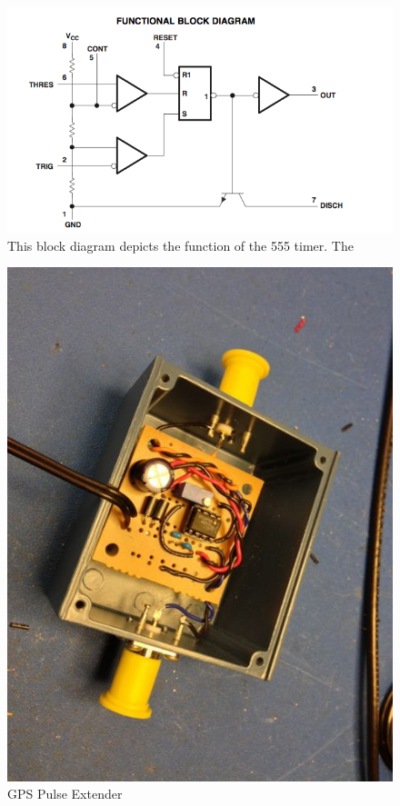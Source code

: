 \begin{figure}[htbp]
	\centering
		\includegraphics[width=15cm]{./figures/timer555.png}
	\caption[555 Timer Diagram]{This block diagram depicts the function of the 555 timer. The }
	\label{fig:timer_diag}
\end{figure}


\begin{figure}[htbp]
	\centering
		\includegraphics[width=15cm]{./figures/IMG_1345.jpg}
	\caption{{GPS Pulse Extender}}
	\label{fig:gps_pulse}
\end{figure}

